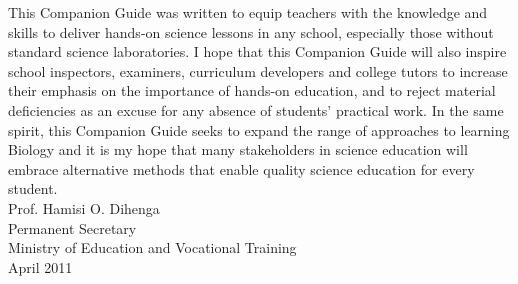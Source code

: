 This Companion Guide was written to equip teachers with the knowledge and skills to deliver hands-on science lessons in any school, especially those without standard science laboratories. I hope that this Companion Guide will also inspire school inspectors, examiners, curriculum developers and college tutors to increase their emphasis on the importance of hands-on education, and to reject material deficiencies as an excuse for any absence of students' practical work. In the same spirit, this Companion Guide seeks to expand the range of approaches to learning Biology and it is my hope that many stakeholders in science education will embrace alternative methods that enable quality science education for every student.\\[80pt]
Prof. Hamisi O. Dihenga\\
Permanent Secretary\\
Ministry of Education and Vocational Training\\
April 2011

